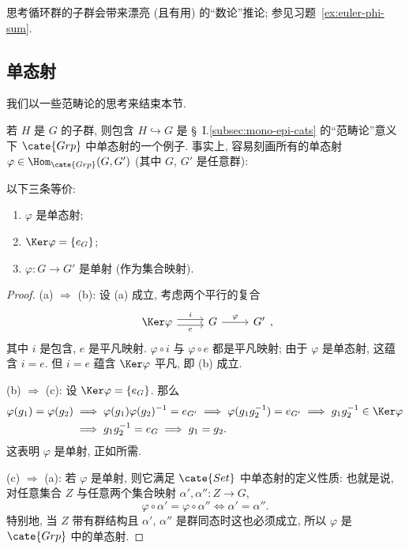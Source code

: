 思考循环群的子群会带来漂亮 (且有用) 的``数论''推论; 参见习题~\ref{ex:euler-phi-sum}.

\subsection{单态射}
\label{subsec:mono-grp}

我们以一些范畴论的思考来结束本节.

若 $H$ 是 $G$ 的子群, 则包含 $H \hookrightarrow G$ 是 \S~I.\ref{subsec:mono-epi-cats} 的``范畴论''意义下 $\cate{Grp}$ 中单态射的一个例子. 事实上, 容易刻画所有的单态射 $\varphi \in \Hom_{\cate{Grp}}(G, G')$ (其中 $G$, $G'$ 是任意群):

\begin{proposition}
\label{prop:mono-kernel}
以下三条等价:
\begin{enumerate}[label=(\alph*)]
	\item $\varphi$ 是单态射;
	\item $\Ker \varphi = \{e_G\}$;
	\item $\varphi : G \to G'$ 是单射 (作为集合映射).
\end{enumerate}
\end{proposition}

\begin{proof}
(a) $\Longrightarrow$ (b): 设 (a) 成立, 考虑两个平行的复合
\[
\begin{tikzcd}
\Ker\varphi \ar[r,shift left=.6ex,"i"] \ar[r,shift right=.6ex,"e"'] & G \ar[r,"\varphi"] & G'
\end{tikzcd},
\]
其中 $i$ 是包含, $e$ 是平凡映射. $\varphi \circ i$ 与 $\varphi \circ e$ 都是平凡映射; 由于 $\varphi$ 是单态射, 这蕴含 $i = e$. 但 $i = e$ 蕴含 $\Ker \varphi$ 平凡, 即 (b) 成立.

(b) $\Longrightarrow$ (c): 设 $\Ker \varphi = \{e_G\}$. 那么
\begin{align*}
\varphi(g_1) = \varphi(g_2) &\implies \varphi(g_1)\varphi(g_2)^{-1} = e_{G'} \implies \varphi(g_1 g_2^{-1}) = e_{G'} \implies g_1 g_2^{-1} \in \Ker \varphi \\
&\implies g_1 g_2^{-1} = e_G \implies g_1 = g_2.
\end{align*}
这表明 $\varphi$ 是单射, 正如所需.

(c) $\Longrightarrow$ (a): 若 $\varphi$ 是单射, 则它满足 $\cate{Set}$ 中单态射的定义性质: 也就是说, 对任意集合 $Z$ 与任意两个集合映射 $\alpha', \alpha'' : Z \to G$,
\[
\varphi \circ \alpha' = \varphi \circ \alpha'' \iff \alpha' = \alpha''.
\]
特别地, 当 $Z$ 带有群结构且 $\alpha'$, $\alpha''$ 是群同态时这也必须成立, 所以 $\varphi$ 是 $\cate{Grp}$ 中的单态射.
\end{proof}


